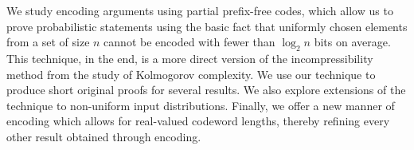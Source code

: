 We study encoding arguments using partial prefix-free codes, which
allow us to prove probabilistic statements using the basic fact that
uniformly chosen elements from a set of size $n$ cannot be encoded
with fewer than $\log_2 n$ bits on average. This technique, in the
end, is a more direct version of the incompressibility method from the
study of Kolmogorov complexity. We use our technique to produce short
original proofs for several results. We also explore extensions of the
technique to non-uniform input distributions. Finally, we offer a new
manner of encoding which allows for real-valued codeword lengths,
thereby refining every other result obtained through encoding.
